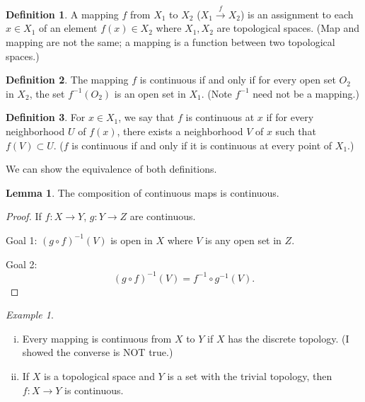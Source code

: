 \documentclass[11pt]{article}
\theoremstyle{definition}
\newtheorem{definition}{Definition}[section]
\newtheorem{lemma}{Lemma}[section]
\theoremstyle{remark}
\newtheorem{example}{Example}[section]
\begin{document}
\begin{definition}\label{def:mapping}
A mapping $f$ from $X_1$ to $X_2$ ($X_1\xrightarrow{f}X_2$) is an assignment to each $x\in X_1$ of an element $f(x)\in X_2$ where $X_1,X_2$ are topological spaces. (Map and mapping are not the same; a mapping is a function between two topological spaces.)
\end{definition}

\begin{definition}\label{def:continuous}
The mapping $f$ is continuous if and only if for every open set $O_2$ in $X_2$, the set $f^{-1}(O_2)$ is an open set in $X_1$. (Note $f^{-1}$ need not be a mapping.)
\end{definition}

\begin{definition}\label{def:continuous_at_point}
For $x\in X_1$, we say that $f$ is continuous at $x$ if for every neighborhood $U$ of $f(x)$, there exists a neighborhood $V$ of $x$ such that $f(V)\subset U$. ($f$ is continuous if and only if it is continuous at every point of $X_1$.)
\end{definition}

We can show the equivalence of both definitions.

\begin{lemma}\label{lem:composition_continuous}
The composition of continuous maps is continuous.
\end{lemma}

\begin{proof}
If $f\colon X\to Y$, $g\colon Y\to Z$ are continuous.

Goal 1: $(g\circ f)^{-1}(V)$ is open in $X$ where $V$ is any open set in $Z$.

Goal 2:
\[
(g\circ f)^{-1}(V)=f^{-1}\circ g^{-1}(V).
\]
\end{proof}

\begin{example}\label{ex:continuous_examples}
\begin{enumerate}[(i)]
\item Every mapping is continuous from $X$ to $Y$ if $X$ has the discrete topology. (I showed the converse is NOT true.)
\item If $X$ is a topological space and $Y$ is a set with the trivial topology, then $f\colon X\rightarrow Y$ is continuous.
\end{enumerate}
\end{example}
\end{document}
